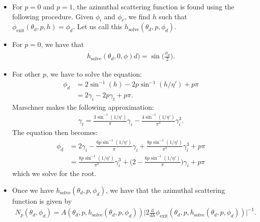 \documentclass[10pt]{article}
\newcommand{\dee}{\mathrm{d}}
\newcommand{\exit}{\mathrm{exit}}
\newcommand{\solve}{\mathrm{solve}}
\begin{document}
  \begin{itemize}    
    \item For $p = 0$ and $p = 1$, the azimuthal scattering
      function is found using the following procedure.
      Given $\phi_i$ and $\phi_r$, we find $h$ such that
      $\phi_\exit(\theta_d, p, h) = \phi_d.$ Let us 
      call this $h_\solve(\theta_d, p, \phi_d)$.
      
    \item For $p = 0$, we have that
      \begin{align*}
        h_\solve(\theta_d, 0, \phi)d) 
        = \sin \bigg( \frac{\phi_d}{2} \bigg).
      \end{align*}
      
    \item For other $p$, we have to solve the equation:
      \begin{align*}
        \phi_d
        &= 2 \sin^{-1}(h) - 2p\sin^{-1}(h/\eta') + p\pi\\
        &= 2 \gamma_i - 2p\gamma_t + p\pi.
      \end{align*}
      Marschner makes the following approximation:
      \begin{align*}
        \gamma_t = \frac{3\sin^{-1}(1/\eta')}{\pi} \gamma_i
          - \frac{4\sin^{-1}(1/\eta')}{\pi^3} \gamma_i^3.
      \end{align*}
      The equation then becomes:
      \begin{align*}
        \phi_d
        &= 2\gamma_i 
        - \frac{6 p\sin^{-1}(1/\eta')}{\pi} \gamma_i 
        + \frac{8 p\sin^{-1}(1/\eta')}{\pi^3} \gamma_i^3 + p\pi\\
        &= \frac{8 p \sin^{-1}(1/\eta')}{\pi^3} \gamma_i^3
        + \bigg( 2 - \frac{6 p\sin^{-1}(1/\eta')}{\pi} \bigg) \gamma_i
        + p\pi
      \end{align*}
      which we solve for the root.
      
    \item Once we have $h_\solve(\theta_d, p, \phi_d)$,
      we have that the azimuthal scattering function is given by
      \begin{align*}
        N_p(\theta_d, \phi_d) =
          A(\theta_d, p, h_\solve(\theta_d, p, \phi_d))
          \bigg| 2 \frac{\dee}{\dee h } 
            \phi_\exit(\theta_d, p, h_\solve(\theta_d, p, \phi_d) ) \bigg|^{-1}.
      \end{align*}
      

\end{itemize}
\end{document}
